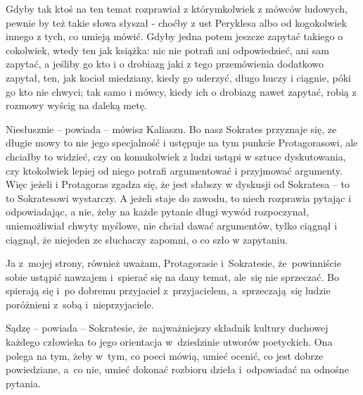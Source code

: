 
\noi Gdyby tak ktoś na ten temat rozprawiał z którymkolwiek z mówców
ludowych, pewnie by też takie słowa słyszał - choćby z ust Peryklesa
albo od kogokolwiek innego z tych, co umieją mówić. Gdyby jedna potem
jeszcze zapytać takiego o cokolwiek, wtedy ten jak książka: nic nie
potrafi ani odpowiedzieć, ani sam zapytać, a jeśliby go kto i o
drobiazg jaki z tego przemówienia dodatkowo zapytał, ten, jak kocioł
miedziany, kiedy go uderzyć, długo huczy i ciągnie, póki go kto nie
chwyci; tak samo i mówcy, kiedy ich o drobiazg nawet zapytać, robią z
rozmowy wyścig na daleką metę.



\noi Niesłusznie -- powiada -- mówisz Kaliaszu. Bo nasz Sokrates
przyznaje się, ze długie mowy to nie jego specjalność i ustępuje na
tym punkcie Protagorasowi, ale chciałby to widzieć, czy on komukolwiek
z ludzi ustąpi w sztuce dyskutowania, czy ktokolwiek lepiej od niego
potrafi argumentować i przyjmować argumenty. Więc jeżeli i Protagoras
zgadza się, że jest słabszy w dyskusji od Sokratesa -- to to
Sokratesowi wystarczy. A jeżeli staje do zawodu, to niech rozprawia
pytając i odpowiadając, a nie, żeby na każde pytanie długi wywód
rozpoczynał, uniemożliwiał chwyty myślowe, nie chciał dawać
argumentów, tylko ciągnął i ciągnął, że niejeden ze słuchaczy zapomni,
o co szło w zapytaniu.


\noi Ja z~mojej strony, również uważam, Protagorasie i~Sokratesie,
że~powinniście sobie ustąpić nawzajem i~spierać się na dany temat,
ale~się nie sprzeczać. Bo spierają się i~po dobremu przyjaciel
z~przyjacielem, a~sprzeczają~się ludzie poróżnieni z~sobą
i~nieprzyjaciele.


\noi Sądzę -- powiada -- Sokratesie, że~najważniejszy składnik kultury
duchowej każdego człowieka to jego orientacja w~dziedzinie utworów
poetyckich. Ona polega na tym, żeby w~tym, co poeci mówią, umieć
ocenić, co jest dobrze powiedziane, a~co nie, umieć dokonać rozbioru
dzieła i~odpowiadać na odnośne pytania.



